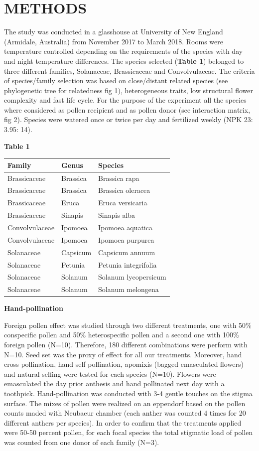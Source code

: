 \documentclass[11pt,a4paper]{article}
\begin{document}
\section{METHODS}\label{methods}

The study was conducted in a glasshouse at University of New England
(Armidale, Australia) from November 2017 to March 2018. Rooms were
temperature controlled depending on the requirements of the species with
day and night temperature differences. The species selected
(\textbf{Table 1}) belonged to three different families, Solanaceae,
Brassicaceae and Convolvulaceae. The criteria of species/family
selection was based on close/distant related species (see phylogenetic
tree for relatedness fig 1), heterogeneous traits, low structural flower
complexity and fast life cycle. For the purpose of the experiment all
the species where considered as pollen recipient and as pollen donor
(see interaction matrix, fig 2). Species were watered once or twice per
day and fertilized weekly (NPK 23: 3.95: 14).

\textbf{Table 1}

\begin{longtable}[]{@{}lll@{}}
\toprule
Family & Genus & Species\tabularnewline
\midrule
\endhead
Brassicaceae & Brassica & Brassica rapa\tabularnewline
Brassicaceae & Brassica & Brassica oleracea\tabularnewline
Brassicaceae & Eruca & Eruca versicaria\tabularnewline
Brassicaceae & Sinapis & Sinapis alba\tabularnewline
Convolvulaceae & Ipomoea & Ipomoea aquatica\tabularnewline
Convolvulaceae & Ipomoea & Ipomoea purpurea\tabularnewline
Solanaceae & Capsicum & Capsicum annuum\tabularnewline
Solanaceae & Petunia & Petunia integrifolia\tabularnewline
Solanaceae & Solanum & Solanum lycopersicum\tabularnewline
Solanaceae & Solanum & Solanum melongena\tabularnewline
\bottomrule
\end{longtable}

\textbf{Hand-pollination}

Foreign pollen effect was studied through two different treatments, one
with 50\% conspecific pollen and 50\% heterospecific pollen and a second
one with 100\% foreign pollen (N=10). Therefore, 180 different
combinations were perform with N=10. Seed set was the proxy of effect
for all our treatments. Moreover, hand cross pollination, hand self
pollination, apomixis (bagged emasculated flowers) and natural selfing
were tested for each species (N=10). Flowers were emasculated the day
prior anthesis and hand pollinated next day with a toothpick.
Hand-pollination was conducted with 3-4 gentle touches on the stigma
surface. The mixes of pollen were realized on an eppendorf based on the
pollen counts maded with Neubaeur chamber (each anther was counted 4
times for 20 different anthers per species). In order to confirm that
the treatments applied were 50-50 percent pollen, for each focal species
the total stigmatic load of pollen was counted from one donor of each
family (N=3).
\end{document}
